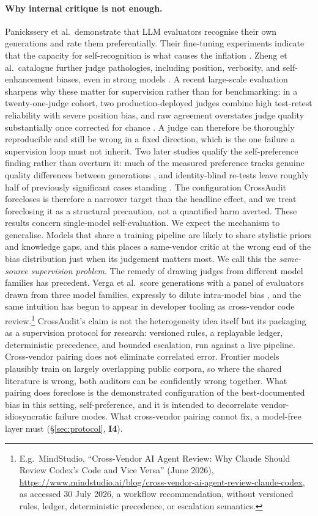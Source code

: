 \documentclass[11pt,letterpaper]{article}
\newcommand{\invariant}[1]{\textbf{I#1}}
\begin{document}
\paragraph{Why internal critique is not enough.} Panickssery et al.\ demonstrate that LLM evaluators recognise their own generations and rate them preferentially. Their fine-tuning experiments indicate that the capacity for self-recognition is what causes the inflation \cite{panickssery2024}. Zheng et al.\ catalogue further judge pathologies, including position, verbosity, and self-enhancement biases, even in strong models \cite{zheng2023}. A recent large-scale evaluation sharpens why these matter for supervision rather than for benchmarking: in a twenty-one-judge cohort, two production-deployed judges combine high test-retest reliability with severe position bias, and raw agreement overstates judge quality substantially once corrected for chance \cite{norman2026reliability}. A judge can therefore be thoroughly reproducible and still be wrong in a fixed direction, which is the one failure a supervision loop must not inherit. Two later studies qualify the self-preference finding rather than overturn it: much of the measured preference tracks genuine quality differences between generations \cite{chen2025selfpref}, and identity-blind re-tests leave roughly half of previously significant cases standing \cite{roytburg2026sanity}. The configuration CrossAudit forecloses is therefore a narrower target than the headline effect, and we treat foreclosing it as a structural precaution, not a quantified harm averted. These results concern single-model self-evaluation. We expect the mechanism to generalise. Models that share a training pipeline are likely to share stylistic priors and knowledge gaps, and this places a same-vendor critic at the wrong end of the bias distribution just when its judgement matters most. We call this the \emph{same-source supervision problem}. The remedy of drawing judges from different model families has precedent. Verga et al.\ score generations with a panel of evaluators drawn from three model families, expressly to dilute intra-model bias \cite{verga2024poll}, and the same intuition has begun to appear in developer tooling as cross-vendor code review.\footnote{E.g.\ MindStudio, ``Cross-Vendor AI Agent Review: Why Claude Should Review Codex's Code and Vice Versa'' (June 2026), \url{https://www.mindstudio.ai/blog/cross-vendor-ai-agent-review-claude-codex}, as accessed 30 July 2026, a workflow recommendation, without versioned rules, ledger, deterministic precedence, or escalation semantics.} CrossAudit's claim is not the heterogeneity idea itself but its packaging as a supervision protocol for research: versioned rules, a replayable ledger, deterministic precedence, and bounded escalation, run against a live pipeline. Cross-vendor pairing does not eliminate correlated error. Frontier models plausibly train on largely overlapping public corpora, so where the shared literature is wrong, both auditors can be confidently wrong together. What pairing does foreclose is the demonstrated configuration of the best-documented bias in this setting, self-preference, and it is intended to decorrelate vendor-idiosyncratic failure modes. What cross-vendor pairing cannot fix, a model-free layer must (\S\ref{sec:protocol}, \invariant{4}).
\end{document}
